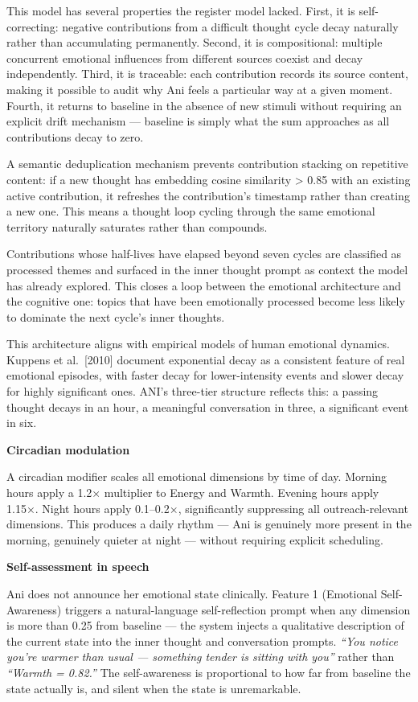 This model has several properties the register model lacked. First, it
is self-correcting: negative contributions from a difficult thought
cycle decay naturally rather than accumulating permanently. Second, it
is compositional: multiple concurrent emotional influences from
different sources coexist and decay independently. Third, it is
traceable: each contribution records its source content, making it
possible to audit why Ani feels a particular way at a given moment.
Fourth, it returns to baseline in the absence of new stimuli without
requiring an explicit drift mechanism --- baseline is simply what the
sum approaches as all contributions decay to zero.

A semantic deduplication mechanism prevents contribution stacking on
repetitive content: if a new thought has embedding cosine similarity
\textgreater{} 0.85 with an existing active contribution, it refreshes
the contribution's timestamp rather than creating a new one. This means
a thought loop cycling through the same emotional territory naturally
saturates rather than compounds.

Contributions whose half-lives have elapsed beyond seven cycles are
classified as processed themes and surfaced in the inner thought prompt
as context the model has already explored. This closes a loop between
the emotional architecture and the cognitive one: topics that have been
emotionally processed become less likely to dominate the next cycle's
inner thoughts.

This architecture aligns with empirical models of human emotional
dynamics. Kuppens et al.~{[}2010{]} document exponential decay as a
consistent feature of real emotional episodes, with faster decay for
lower-intensity events and slower decay for highly significant ones.
ANI's three-tier structure reflects this: a passing thought decays in an
hour, a meaningful conversation in three, a significant event in six.

\textbf{Circadian modulation}

A circadian modifier scales all emotional dimensions by time of day.
Morning hours apply a 1.2× multiplier to Energy and Warmth. Evening
hours apply 1.15×. Night hours apply 0.1--0.2×, significantly
suppressing all outreach-relevant dimensions. This produces a daily
rhythm --- Ani is genuinely more present in the morning, genuinely
quieter at night --- without requiring explicit scheduling.

\textbf{Self-assessment in speech}

Ani does not announce her emotional state clinically. Feature 1
(Emotional Self-Awareness) triggers a natural-language self-reflection
prompt when any dimension is more than 0.25 from baseline --- the system
injects a qualitative description of the current state into the inner
thought and conversation prompts. \emph{``You notice you're warmer than
usual --- something tender is sitting with you''} rather than
\emph{``Warmth = 0.82.''} The self-awareness is proportional to how far
from baseline the state actually is, and silent when the state is
unremarkable.

